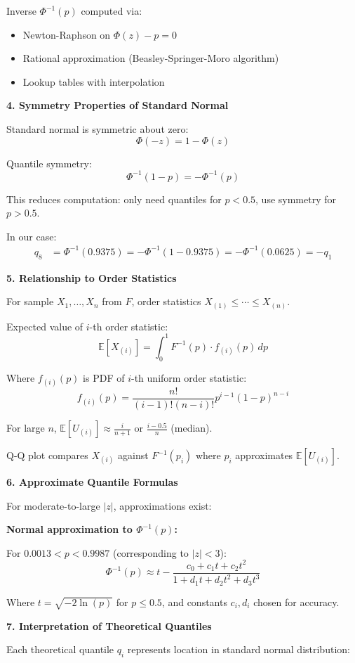 \documentclass[12pt]{article}
\begin{document}
\begin{explanation}
Inverse $\Phi^{-1}(p)$ computed via:
\begin{itemize}
\item Newton-Raphson on $\Phi(z) - p = 0$
\item Rational approximation (Beasley-Springer-Moro algorithm)
\item Lookup tables with interpolation
\end{itemize}

\textbf{4. Symmetry Properties of Standard Normal}

Standard normal is symmetric about zero:
\[\Phi(-z) = 1 - \Phi(z)\]

Quantile symmetry:
\[\Phi^{-1}(1-p) = -\Phi^{-1}(p)\]

This reduces computation: only need quantiles for $p < 0.5$, use symmetry for $p > 0.5$.

In our case:
\begin{align*}
q_8 &= \Phi^{-1}(0.9375) = -\Phi^{-1}(1 - 0.9375) = -\Phi^{-1}(0.0625) = -q_1
\end{align*}

\textbf{5. Relationship to Order Statistics}

For sample $X_1, \ldots, X_n$ from $F$, order statistics $X_{(1)} \leq \cdots \leq X_{(n)}$.

Expected value of $i$-th order statistic:
\[\mathbb{E}[X_{(i)}] = \int_0^1 F^{-1}(p) \cdot f_{(i)}(p) \, dp\]

Where $f_{(i)}(p)$ is PDF of $i$-th uniform order statistic:
\[f_{(i)}(p) = \frac{n!}{(i-1)!(n-i)!} p^{i-1} (1-p)^{n-i}\]

For large $n$, $\mathbb{E}[U_{(i)}] \approx \frac{i}{n+1}$ or $\frac{i-0.5}{n}$ (median).

Q-Q plot compares $X_{(i)}$ against $F^{-1}(p_i)$ where $p_i$ approximates $\mathbb{E}[U_{(i)}]$.

\textbf{6. Approximate Quantile Formulas}

For moderate-to-large $|z|$, approximations exist:

\textbf{Normal approximation to $\Phi^{-1}(p)$:}

For $0.0013 < p < 0.9987$ (corresponding to $|z| < 3$):
\[\Phi^{-1}(p) \approx t - \frac{c_0 + c_1 t + c_2 t^2}{1 + d_1 t + d_2 t^2 + d_3 t^3}\]

Where $t = \sqrt{-2\ln(p)}$ for $p \leq 0.5$, and constants $c_i, d_i$ chosen for accuracy.

\textbf{7. Interpretation of Theoretical Quantiles}

Each theoretical quantile $q_i$ represents location in standard normal distribution:


\end{explanation}
\end{document}
